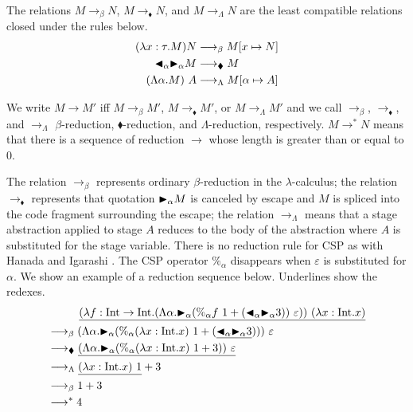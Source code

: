 \begin{definition}[Reduction]
    The relations $M \longrightarrow_\beta N$, $M \longrightarrow_\blacklozenge N$, and $M \longrightarrow_\Lambda N$
    are the least compatible relations closed under the rules below.
{%
    \begin{align*}
         (\lambda x:\tau.M) N & \longrightarrow_\beta M[x \mapsto N]         \\
         {\mathop{\blacktriangleleft}}_\alpha {\mathop{\blacktriangleright}}_\alpha M & \longrightarrow_\blacklozenge M          \\
         (\Lambda \alpha.M)\ A & \longrightarrow_\Lambda M[\alpha \mapsto A]
    \end{align*}
  }    
\end{definition}
We write $ M \longrightarrow M'$ iff $ M \longrightarrow_\beta M'$,
$ M \longrightarrow_\blacklozenge M'$, or
$ M \longrightarrow_\Lambda M'$ and we call $\longrightarrow_\beta$,
$\longrightarrow_\blacklozenge$, and $\longrightarrow_\Lambda$
$\beta$-reduction, $\blacklozenge$-reduction, and $\Lambda$-reduction,
respectively.
$M \longrightarrow^* N$ means that there is a sequence of reduction $\longrightarrow$ whose length is greater than or equal to 0.

The relation $\longrightarrow_\beta$ represents ordinary $\beta$-reduction in the \(\lambda\)-calculus; the relation
$\longrightarrow_\blacklozenge$ represents that quotation ${\mathop{\blacktriangleright}}_\alpha M$ is canceled by escape and $M$ is spliced into the code fragment surrounding the escape;
the relation $\longrightarrow_\Lambda$ means that a stage abstraction applied to  stage $A$ reduces to the body of the abstraction
where $A$ is substituted for the stage variable.
There is no reduction rule for CSP as with Hanada and Igarashi \cite{Hanada2014}.
The CSP operator $\%_\alpha$ disappears when $\varepsilon$ is substituted for $\alpha$.
We show an example of a reduction sequence below.
Underlines show the redexes.
\begin{align*}
     & \hspace{10mm} \underline{(\lambda f:\I\to\I.(\Lambda\alpha.\TB_\alpha (\%_\alpha f\ 1 + (\TBL_\alpha \TB_\alpha 3))\ \varepsilon))\ (\lambda x:\I.x)} \\
     & \longrightarrow_\beta (\Lambda\alpha.\TB_\alpha (\%_\alpha (\lambda x:\I.x)\ 1 + (\underline{\TBL_\alpha \TB_\alpha 3})))\ \varepsilon        \\
     & \longrightarrow_\blacklozenge \underline{(\Lambda\alpha.\TB_\alpha (\%_\alpha (\lambda x:\I.x)\ 1 + 3))\ \varepsilon}                                         \\
     & \longrightarrow_\Lambda \underline{(\lambda x:\I.x)\ 1} + 3                                                                                           \\
     & \longrightarrow_\beta 1 + 3                                                                                                                           \\
     & \longrightarrow^* 4
\end{align*}

